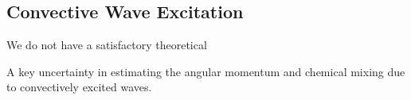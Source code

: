 {\color{purple}
\subsection{Convective Wave Excitation}
}

We do not have a satisfactory theoretical 

A key uncertainty in estimating the angular momentum and chemical mixing due to convectively excited waves.
